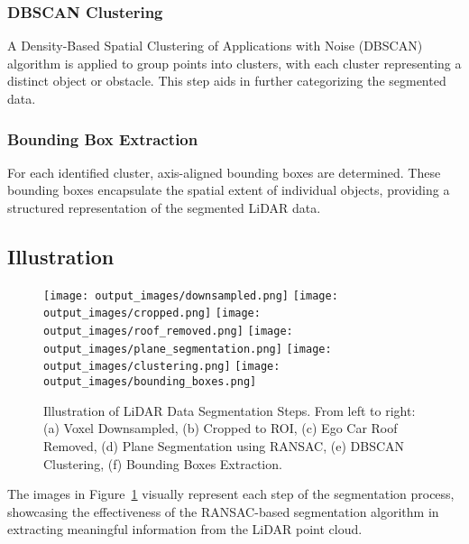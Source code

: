 \subsubsection{DBSCAN Clustering}
A Density-Based Spatial Clustering of Applications with Noise (DBSCAN) algorithm is applied to group points into clusters, with each cluster representing a distinct object or obstacle. This step aids in further categorizing the segmented data.

\subsubsection{Bounding Box Extraction}
For each identified cluster, axis-aligned bounding boxes are determined. These bounding boxes encapsulate the spatial extent of individual objects, providing a structured representation of the segmented LiDAR data.

\subsection{Illustration}

\begin{figure}[h]
    \centering
    \texttt{[image: output\_images/downsampled.png]}
    \texttt{[image: output\_images/cropped.png]}
    \texttt{[image: output\_images/roof\_removed.png]}
    \texttt{[image: output\_images/plane\_segmentation.png]}
    \texttt{[image: output\_images/clustering.png]}
    \texttt{[image: output\_images/bounding\_boxes.png]}
    \caption{Illustration of LiDAR Data Segmentation Steps. From left to right: (a) Voxel Downsampled, (b) Cropped to ROI, (c) Ego Car Roof Removed, (d) Plane Segmentation using RANSAC, (e) DBSCAN Clustering, (f) Bounding Boxes Extraction.}
    \label{fig:segmentation_steps}
\end{figure}

The images in Figure~\ref{fig:segmentation_steps} visually represent each step of the segmentation process, showcasing the effectiveness of the RANSAC-based segmentation algorithm in extracting meaningful information from the LiDAR point cloud.

\clearpage
